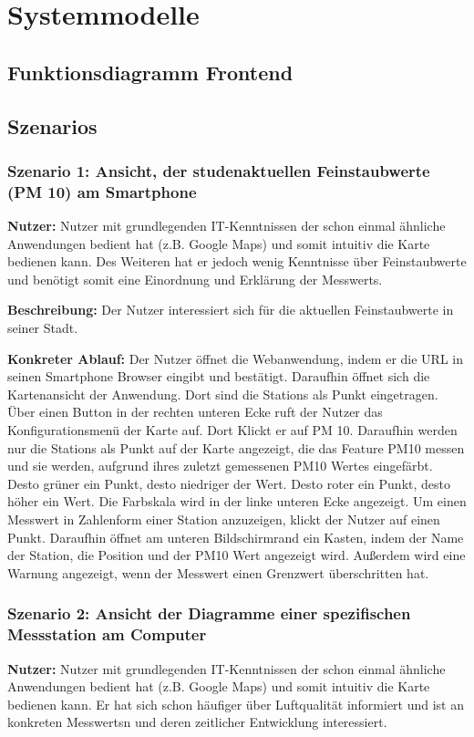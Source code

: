 \section{Systemmodelle}

\subsection{Funktionsdiagramm Frontend}

\subsection{Szenarios}

\subsubsection{Szenario 1: Ansicht, der studenaktuellen Feinstaubwerte (PM 10) am Smartphone}
\textbf{Nutzer:} Nutzer mit grundlegenden IT-Kenntnissen der schon einmal ähnliche Anwendungen bedient hat (z.B. Google Maps) und somit intuitiv die Karte bedienen kann. Des Weiteren hat er jedoch wenig Kenntnisse über Feinstaubwerte und benötigt somit eine Einordnung und Erklärung der \glspl{Messwert}.

\textbf{Beschreibung:} Der Nutzer interessiert sich für die aktuellen Feinstaubwerte in seiner Stadt.

\textbf{Konkreter Ablauf:}
Der Nutzer öffnet die \gls{Webanwendung}, indem er die URL in seinen Smartphone Browser eingibt und bestätigt. Daraufhin öffnet sich die Kartenansicht der Anwendung. Dort sind die \glspl{Station} als Punkt eingetragen. Über einen Button in der rechten unteren Ecke ruft der Nutzer das Konfigurationsmenü der Karte auf. Dort Klickt er auf PM 10. Daraufhin werden nur die \glspl{Station} als Punkt auf der Karte angezeigt, die das \gls{Feature} PM10 messen und sie werden, aufgrund ihres zuletzt gemessenen PM10 Wertes eingefärbt. Desto grüner ein Punkt, desto niedriger der Wert. Desto roter ein Punkt, desto höher ein Wert. Die Farbskala wird in der linke unteren Ecke angezeigt.
Um einen \gls{Messwert} in Zahlenform einer \gls{Station} anzuzeigen, klickt der Nutzer auf einen Punkt. Daraufhin öffnet am unteren Bildschirmrand ein Kasten, indem der Name der \gls{Station}, die Position und der PM10 Wert angezeigt wird. Außerdem wird eine Warnung angezeigt, wenn der \gls{Messwert} einen Grenzwert überschritten hat.

\subsubsection{Szenario 2: Ansicht der Diagramme einer spezifischen Messstation am Computer}
\textbf{Nutzer:} Nutzer mit grundlegenden IT-Kenntnissen der schon einmal ähnliche Anwendungen bedient hat (z.B. Google Maps) und somit intuitiv die Karte bedienen kann. Er hat sich schon häufiger über Luftqualität informiert und ist an konkreten \glspl{Messwert}n und deren zeitlicher Entwicklung interessiert.

